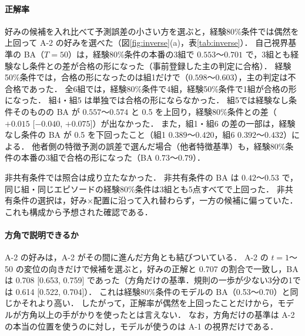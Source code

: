 \begin{table}[t]
  \centering
  \small
  \caption{仮説の照合の結果}
  \label{tab:inverse}
  
\end{table}

\paragraph{正解率}
好みの候補を入れ比べて予測誤差の小さい方を選ぶと，経験80\%条件では偶然を上回って A-2 の好みを選べた（図\ref{fig:inverse}(a)，表\ref{tab:inverse}）．
自己視界基準の BA（$T=50$）は，経験80\%条件の本番の3組で $0.553$〜$0.701$ で，3組とも経験なし条件との差が合格の形になった（事前登録した主の判定に合格）．
経験50\%条件では，合格の形になったのは組1だけで（$0.598$〜$0.603$），主の判定は不合格であった．
全6組では，経験80\%条件で4組，経験50\%条件で1組が合格の形になった．
組4・組5 は単独では合格の形にならなかった．
組5では経験なし条件そのものの BA が $0.557$〜$0.574$ と 0.5 を上回り，経験80\%条件との差（$+0.015$ [$-0.040$, $+0.075$]）が出なかった．
また，組1・組6 の差の一部は，経験なし条件の BA が 0.5 を下回ったこと（組1 $0.389$〜$0.420$，組6 $0.392$〜$0.432$）による．
他者側の特徴予測の誤差で選んだ場合（他者特徴基準）も，経験80\%条件の本番の3組で合格の形になった（BA $0.73$〜$0.79$）．

非共有条件では照合は成り立たなかった．
非共有条件の BA は $0.42$〜$0.53$ で，同じ組・同じエピソードの経験80\%条件は3組とも5点すべてで上回った．
非共有条件の選択は，好み×配置に沿って入れ替わらず，一方の候補に偏っていた．
これも構成から予想された確認である．

\paragraph{方角で説明できるか}
A-2 の好みは，A-2 がその間に進んだ方角とも結びついている．
A-2 の $t=1$〜50 の変位の向きだけで候補を選ぶと，好みの正解と 0.707 の割合で一致し，BA は 0.708 [0.653, 0.759] であった（方角だけの基準．規則の一歩が少ない3分の1では 0.614 [0.522, 0.704]）．
これは経験80\%条件のモデルの BA（0.53〜0.70）と同じかそれより高い．
したがって，正解率が偶然を上回ったことだけから，モデルが方角以上の手がかりを使ったとは言えない．
なお，方角だけの基準は A-2 の本当の位置を使うのに対し，モデルが使うのは A-1 の視界だけである．

